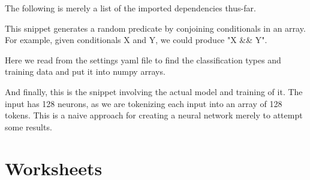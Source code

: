\documentclass{article}
\begin{document}
    The following is merely a list of the imported dependencies thus-far.
    

    This snippet generates a random predicate by conjoining conditionals in an array.
    For example, given conditionals X and Y, we could produce "X \&\& Y".
    

    Here we read from the settings yaml file to find the classification types and training data and put it into numpy arrays.
    

    And finally, this is the snippet involving the actual model and training of it.
    The input has 128 neurons, as we are tokenizing each input into an array of 128 tokens.
    This is a naive approach for creating a neural network merely to attempt some results.
    

    

    

    

    \section{Worksheets}
\end{document}
